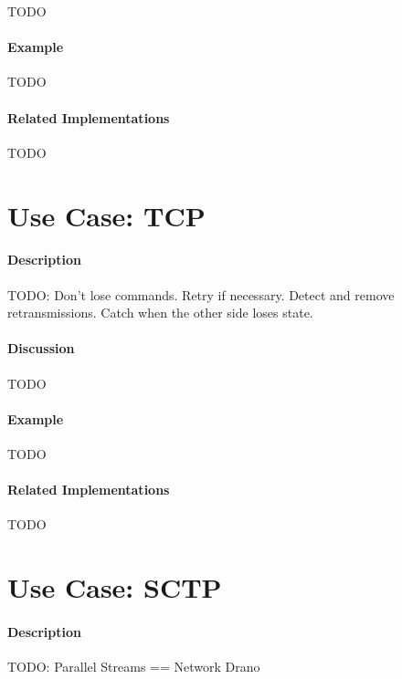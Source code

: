 {\Large TODO}

\paragraph{Example}

{\Large TODO}

\paragraph{Related Implementations}

{\Large TODO}

\section{Use Case: TCP}

\paragraph{Description}

{\Large TODO:} Don't lose commands. Retry if necessary. Detect and remove retransmissions. Catch when the other side loses state.

\paragraph{Discussion}

{\Large TODO}

\paragraph{Example}

{\Large TODO}

\paragraph{Related Implementations}

{\Large TODO}

\section{Use Case: SCTP}

\paragraph{Description}

{\Large TODO:} Parallel Streams == Network Drano\texttrademark

